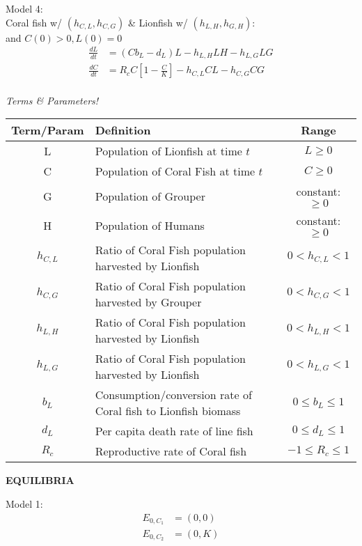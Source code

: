 \documentclass[11pt]{article}
\begin{document}
{Model 4:\\
Coral fish w/ $(h_{C,L}, h_{C,G})$ \& Lionfish w/ $(h_{L,H}, h_{G,H})$:\\
and $C(0) > 0,  L(0) = 0$\\
\begin{align*}
\frac{dL}{dt} &= (C b_{L} - d_{L}) L - h_{L,H}LH - h_{L,G}LG\\
\frac{dC}{dt} &= R_{c}C \left[ 1 - \frac{C}{K} \right] - h_{C,L}CL - h_{C,G}CG
\end{align*}
\vspace{.5in}\\
\emph{Terms \& Parameters!}
\begin{center}
\begin{tabular}{| c || l | c |}
\hline
Term/Param & Definition & Range \\ \hline
L& Population of Lionfish at time $t$ & $L\geq 0$\\ \hline
C& Population of Coral Fish at time $t$ & $ C \geq 0 $\\ \hline
G& Population of Grouper& constant: $\geq 0$\\ \hline
H& Population of Humans&constant: $\geq 0$\\ \hline
$h_{C,L}$& Ratio of Coral Fish population harvested by Lionfish& $0< h_{C,L} <1$\\ \hline
$h_{C,G}$&Ratio of Coral Fish population harvested by Grouper&$0< h_{C,G} <1$\\ \hline
$h_{L,H}$&Ratio of Coral Fish population harvested by Lionfish&$0< h_{L,H} <1$\\ \hline
$h_{L,G}$&Ratio of Coral Fish population harvested by Lionfish&$0< h_{L,G} <1$\\ \hline
$b_{L}$& Consumption/conversion rate of Coral fish to Lionfish biomass & $ 0\leq b_{L} \leq 1$ \\ \hline
$d_{L}$& Per capita death rate of line fish & $0 \leq d_{L} \leq 1$ \\ \hline
$R_{c}$& Reproductive rate of Coral fish & $ -1 \leq R_{c} \leq 1 $ \\ \hline
\end{tabular}
\end{center}
\vspace{.5in}
\textbf{EQUILIBRIA}

Model 1:
\begin{align*}
E_{0, C_{1}} &= \left( 0, 0 \right)\\
E_{0, C_{2}} &= \left( 0, K \right)
\end{align*}

}
\end{document}
